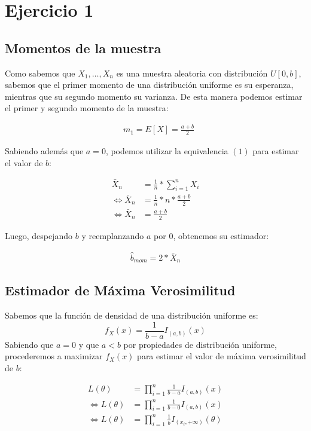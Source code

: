 \section{Ejercicio 1}
\subsection{Momentos de la muestra}
Como sabemos que $X_{1}, \dots, X_{n}$ es una muestra aleatoria con distribución $U[0, b]$, sabemos que el primer momento de una distribución uniforme es su esperanza, mientras que su segundo momento su varianza. De esta manera podemos estimar el primer y segundo momento de la muestra:

\begin{align}
	&m_{1} = E[X] = \frac{a + b}{2} %
\end{align}

Sabiendo además que $a = 0$, podemos utilizar la equivalencia $(1)$ para estimar el valor de $b$:

\begin{align*}
	\bar{X}_{n} &= \frac{1}{n} * \sum_{i=1}^{n}X_{i} \\
	\iff \bar{X}_{n} &= \frac{1}{n} * n * \frac{a + b}{2} \\
	\iff \bar{X}_{n} &= \frac{a + b}{2}
\end{align*}

Luego, despejando $b$ y reemplanzando $a$ por $0$, obtenemos su estimador:

\begin{align*}
	\hat{b}_{mom} = 2 * \bar{X}_{n}
\end{align*}

\subsection{Estimador de Máxima Verosimilitud}
Sabemos que la función de densidad de una distribución uniforme es:
$$f_{X}(x)=\frac{1}{b - a}I_{(a, b)}(x)$$
Sabiendo que $a = 0$ y que $a < b$ por propiedades de distribución uniforme, procederemos a maximizar $f_{X}(x)$ para estimar el valor de máxima verosimilitud de $b$:

\begin{align*}
	L(\theta) &= \prod_{i=1}^{n}\frac{1}{b - a}I_{(a, b)}(x) \\
	\iff L(\theta) &= \prod_{i=1}^{n}\frac{1}{b - 0}I_{(a, b)}(x) \\
	\iff L(\theta) &= \prod_{i=1}^{n}\frac{1}{b}I_{(x_{i}, +\infty)}(\theta)
\end{align*}

